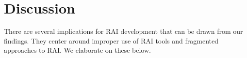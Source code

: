 \section{Discussion}\label{sec:discussion}


There are several implications for RAI development that can be drawn from our findings. They center around improper use of RAI tools and fragmented approaches to RAI. We elaborate on these below. 


